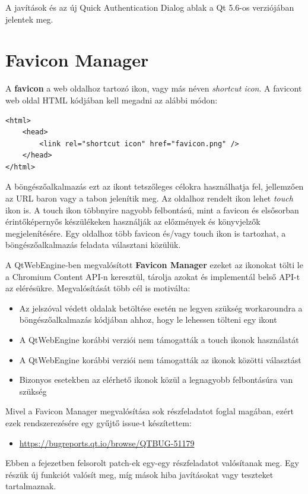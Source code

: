 \documentclass[12pt]{report}
\let\origurl\url
\renewcommand{\url}[1]{%
    \textcolor{blue}{\origurl{#1}}
}
\newcommand{\qtbug}[1]{%
    \textcolor{qtred}{\origurl{https://bugreports.qt.io/browse/QTBUG-#1}}
}
\begin{document}
A javítások és az új Quick Authentication Dialog ablak a Qt 5.6-os verziójában jelentek meg.
\newpage


\section{Favicon Manager}

\noindent
A \textbf{favicon} a web oldalhoz tartozó ikon, vagy más néven \textit{shortcut icon}. A
favicont web oldal HTML kódjában kell megadni az alábbi módon:
\begin{verbatim}
<html>
    <head>
        <link rel="shortcut icon" href="favicon.png" />
    </head>
</html>
\end{verbatim}
A böngészőalkalmazás ezt az ikont tetszőleges célokra használhatja fel, jellemzően az URL
baron vagy a tabon jelenítik meg. Az oldalhoz rendelt ikon lehet \textit{touch} ikon is.
A touch ikon többnyire nagyobb felbontású, mint a favicon és elsősorban érintőképernyős
készülékeken használják az előzmények és könyvjelzők megjelenítésére. Egy oldalhoz több
favicon és/vagy touch ikon is tartozhat, a böngészőalkalmazás feladata választani közülük.

A QtWebEngine-ben megvalósított \textbf{Favicon Manager} ezeket az ikonokat tölti le a
Chromium Content API-n keresztül, tárolja azokat és implementál belső API-t az elérésükre.
Megvalósítását több cél is motiválta:
\begin{itemize}
    \item Az jelszóval védett oldalak betöltése esetén ne legyen szükség workaroundra a
        böngészőalkalmazás kódjában ahhoz, hogy le lehessen tölteni egy ikont
    \item A QtWebEngine korábbi verziói nem támogatták a touch ikonok használatát
    \item A QtWebEngine korábbi verziói nem támogatták az ikonok közötti választást
    \item Bizonyos esetekben az elérhető ikonok közül a legnagyobb felbontásúra van szükség
\end{itemize}

Mivel a Favicon Manager megvalósítása sok részfeladatot foglal magában, ezért ezek
rendszerezésére egy gyűjtő issue-t készítettem:
\begin{center}
    \begin{issuebox}
        \begin{itemize}
            \renewcommand{\labelitemi}{\textcolor{qtred}{$\blacktriangleright$}}
            \item \qtbug{51179}
        \end{itemize}
    \end{issuebox}
\end{center}
Ebben a fejezetben felsorolt patch-ek egy-egy részfeladatot valósítanak meg. Egy részük
új funkciót valósít meg, míg mások hiba javításokat vagy teszteket tartalmaznak.
\end{document}
